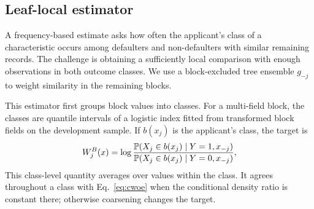 \subsection{Leaf-local estimator}

A frequency-based estimate asks how often the applicant's class of a characteristic occurs among defaulters and non-defaulters with similar remaining records. The challenge is obtaining a sufficiently local comparison with enough observations in both outcome classes. We use a block-excluded tree ensemble $g_{-j}$ to weight similarity in the remaining blocks.

This estimator first groups block values into classes. For a multi-field block, the classes are quantile intervals of a logistic index fitted from transformed block fields on the development sample. If $b(x_j)$ is the applicant's class, the target is
\begin{equation}\label{eq:binwoe}
W_j^{B}(x)=\log\frac{\mathbb P(X_j\in b(x_j)\mid Y=1,x_{-j})}{\mathbb P(X_j\in b(x_j)\mid Y=0,x_{-j})},
\end{equation}
This class-level quantity averages over values within the class. It agrees throughout a class with Eq.~\eqref{eq:cwoe} when the conditional density ratio is constant there; otherwise coarsening changes the target.

